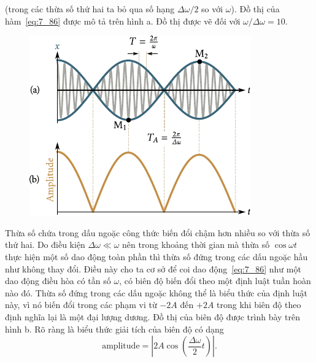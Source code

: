 \noindent
(trong các thừa số thứ hai ta bỏ qua số hạng $\Delta\omega/2$ so với $\omega$). Đồ thị của hàm~\eqref{eq:7_86} được mô tả trên hình a. Đồ thị được vẽ đối với $\omega/\Delta\omega=10$.

\begin{figure}[!htb]
	\begin{minipage}[t]{\linewidth}
		\begin{center}
			\includegraphics[scale=1.0]{figures/ch_07/fig_7_11.pdf}
			\caption[]{}
			\label{fig:7_11}
		\end{center}
	\end{minipage}
\end{figure}

Thừa số chứa trong dấu ngoặc công thức  biến đổi chậm hơn nhiều so với thừa số thứ hai. Do điều kiện $\Delta\omega\ll\omega$ nên trong khoảng thời gian mà thừa số $\cos\omega t$ thực hiện một số dao động toàn phần thì thừa số đứng trong các dấu ngoặc hầu như không thay đổi. Điều này cho ta cơ sở để coi dao động~\eqref{eq:7_86} như một dao động điều hòa có tần số $\omega$, có biên độ biến đổi theo một định luật tuần hoàn nào đó. Thừa số đứng trong các dấu ngoặc không thể là biểu thức của định luật này, vì nó biến đổi trong các phạm vi từ $-2A$ đến $+2A$ trong khi biên độ theo định nghĩa lại là một đại lượng dương. Đồ thị của biên độ được trình bày trên hình b. Rõ ràng là biểu thức giải tích của biên độ có dạng
\begin{equation}\label{eq:7_87}
	\text{amplitude} = \left|2A\cos\left(\frac{\Delta\omega}{2}t\right)\right|.
\end{equation}

